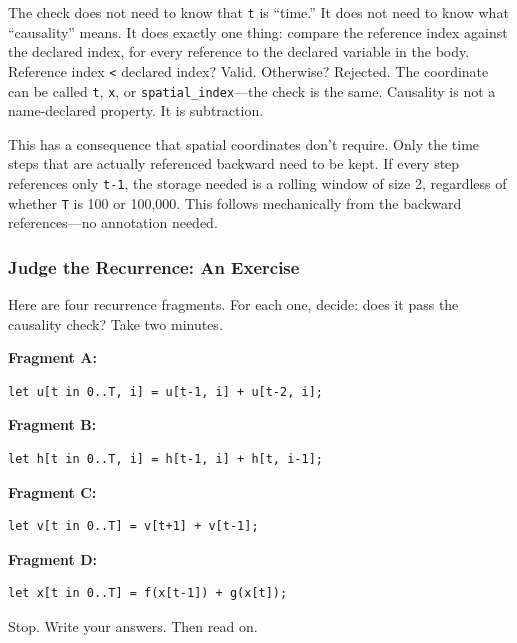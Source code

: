 \documentclass[11pt,titlepage]{article}
\begin{document}
The check does not need to know that \texttt{t} is ``time.'' It does not
need to know what ``causality'' means. It does exactly one thing:
compare the reference index against the declared index, for every
reference to the declared variable in the body. Reference index
\texttt{\textless{}} declared index? Valid. Otherwise? Rejected. The
coordinate can be called \texttt{t}, \texttt{x}, or
\texttt{spatial\_index}---the check is the same. Causality is not a
name-declared property. It is subtraction.

This has a consequence that spatial coordinates don't require. Only the
time steps that are actually referenced backward need to be kept. If
every step references only \texttt{t-1}, the storage needed is a rolling
window of size 2, regardless of whether \texttt{T} is 100 or 100,000.
This follows mechanically from the backward references---no annotation
needed.

\vspace{2em}

\hypertarget{judge-the-recurrence-an-exercise}{%
\subsubsection{Judge the Recurrence: An
Exercise}\label{judge-the-recurrence-an-exercise}}

Here are four recurrence fragments. For each one, decide: does it pass
the causality check? Take two minutes.

\textbf{Fragment A:}

\begin{verbatim}
let u[t in 0..T, i] = u[t-1, i] + u[t-2, i];
\end{verbatim}

\textbf{Fragment B:}

\begin{verbatim}
let h[t in 0..T, i] = h[t-1, i] + h[t, i-1];
\end{verbatim}

\textbf{Fragment C:}

\begin{verbatim}
let v[t in 0..T] = v[t+1] + v[t-1];
\end{verbatim}

\textbf{Fragment D:}

\begin{verbatim}
let x[t in 0..T] = f(x[t-1]) + g(x[t]);
\end{verbatim}

Stop. Write your answers. Then read on.
\end{document}
